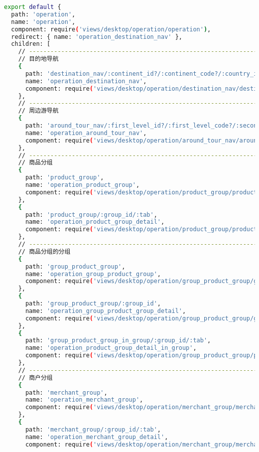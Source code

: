 \begin{lstlisting}[language=bash]
export default {
  path: 'operation',
  name: 'operation',
  component: require('views/desktop/operation/operation'),
  redirect: { name: 'operation_destination_nav' },
  children: [
    // ----------------------------------------------------------------------------------------
    // 目的地导航
    {
      path: 'destination_nav/:continent_id?/:continent_code?/:country_id?/:country_code?',
      name: 'operation_destination_nav',
      component: require('views/desktop/operation/destination_nav/destination_nav')
    },
    // ----------------------------------------------------------------------------------------
    // 周边游导航
    {
      path: 'around_tour_nav/:first_level_id?/:first_level_code?/:second_level_id?/:second_level_code?',
      name: 'operation_around_tour_nav',
      component: require('views/desktop/operation/around_tour_nav/around_tour_nav')
    },
    // ----------------------------------------------------------------------------------------
    // 商品分组
    {
      path: 'product_group',
      name: 'operation_product_group',
      component: require('views/desktop/operation/product_group/product_group')
    },
    {
      path: 'product_group/:group_id/:tab',
      name: 'operation_product_group_detail',
      component: require('views/desktop/operation/product_group/product_group_detail')
    },
    // ----------------------------------------------------------------------------------------
    // 商品分组的分组
    {
      path: 'group_product_group',
      name: 'operation_group_product_group',
      component: require('views/desktop/operation/group_product_group/group_product_group')
    },
    {
      path: 'group_product_group/:group_id',
      name: 'operation_group_product_group_detail',
      component: require('views/desktop/operation/group_product_group/group_product_group_detail')
    },
    {
      path: 'group_product_group_in_group/:group_id/:tab',
      name: 'operation_product_group_detail_in_group',
      component: require('views/desktop/operation/group_product_group/product_group_detail_in_group')
    },
    // ----------------------------------------------------------------------------------------
    // 商户分组
    {
      path: 'merchant_group',
      name: 'operation_merchant_group',
      component: require('views/desktop/operation/merchant_group/merchant_group')
    },
    {
      path: 'merchant_group/:group_id/:tab',
      name: 'operation_merchant_group_detail',
      component: require('views/desktop/operation/merchant_group/merchant_group_detail')

\end{lstlisting}
